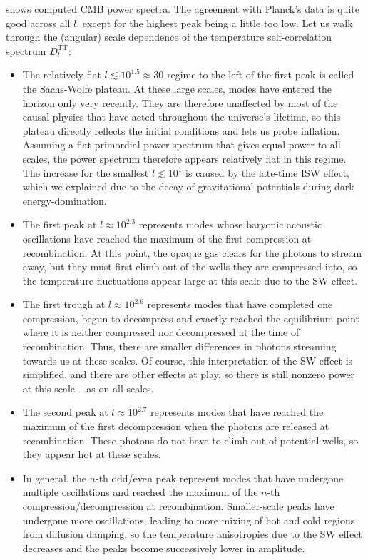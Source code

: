 \documentclass[10pt,a4paper]{article}
\begin{document}
 shows computed CMB power spectra.
The agreement with Planck's data is quite good across all $l$,
except for the highest peak being a little too low.
Let us walk through the (angular) scale dependence of the temperature self-correlation spectrum $D_l^\text{TT}$:
\begin{itemize}
\item
The relatively flat $l \lesssim 10^{1.5} \approx 30$ regime to the left of the first peak is called the Sachs-Wolfe plateau.
At these large scales, modes have entered the horizon only very recently.
They are therefore unaffected by most of the causal physics that have acted throughout the universe's lifetime,
so this plateau directly reflects the initial conditions and lets us probe inflation.
Assuming a flat primordial power spectrum that gives equal power to all scales,
the power spectrum therefore appears relatively flat in this regime.
The increase for the smallest $l \lesssim 10^1$ is caused by the late-time ISW effect,
which we explained due to the decay of gravitational potentials during dark energy-domination.

\item
The first peak at $l \approx 10^{2.3}$ represents modes whose baryonic acoustic oscillations
have reached the maximum of the first compression at recombination.
At this point, the opaque gas clears for the photons to stream away,
but they must first climb out of the wells they are compressed into,
so the temperature fluctuations appear large at this scale due to the SW effect.

\item
The first trough at $l \approx 10^{2.6}$ represents modes that have
completed one compression, begun to decompress and exactly reached the equilibrium point
where it is neither compressed nor decompressed at the time of recombination.
Thus, there are smaller differences in photons streaming towards us at these scales.
Of course, this interpretation of the SW effect is simplified, and there are other effects at play,
so there is still nonzero power at this scale -- as on all scales.

\item
The second peak at $l \approx 10^{2.7}$ represents modes that have reached
the maximum of the first decompression when the photons are released at recombination.
These photons do not have to climb out of potential wells, so they appear hot at these scales.

\item
In general, the $n$-th odd/even peak represent modes that have
undergone multiple oscillations and reached the maximum of the $n$-th compression/decompression at recombination.
Smaller-scale peaks have undergone more oscillations,
leading to more mixing of hot and cold regions from diffusion damping,
so the temperature anisotropies due to the SW effect decreases and the peaks become successively lower in amplitude.
\end{itemize}
\end{document}
